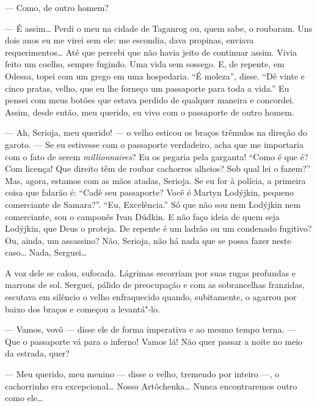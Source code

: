 --- Como, de outro homem?

--- É assim\ldots{} Perdi o meu na cidade de Taganrog ou, quem sabe, o
roubaram. Uns dois anos eu me virei sem ele: me escondia, dava propinas,
enviava requerimentos\ldots{} Até que percebi que não havia jeito de
continuar assim. Vivia feito um coelho, sempre fugindo. Uma vida sem
sossego. E, de repente, em Odessa, topei com um grego em uma hospedaria.
``É moleza'', disse. ``Dê vinte e cinco pratas, velho, que eu lhe forneço
um passaporte para toda a vida.'' Eu pensei com meus botões que estava
perdido de qualquer maneira e concordei. Assim, desde então, meu
querido, eu vivo com o passaporte de outro homem.


--- Ah, Serioja, meu querido! --- o velho esticou os braços trêmulos na
direção do garoto. --- Se eu estivesse com o passaporte verdadeiro, acha
que me importaria com o fato de serem \emph{millionnaires}? Eu os pegaria
pela garganta! ``Como é que é? Com licença! Que direito têm de roubar
cachorros alheios? Sob qual lei o fazem?'' Mas, agora, estamos com as
mãos atadas, Serioja. Se eu for à polícia, a primeira coisa que falarão
é: ``Cadê seu passaporte? Você é Martyn Lodýjkin, pequeno comerciante de
Samara?''. ``Eu, Excelência.'' Só que não sou nem Lodýjkin nem
comerciante, sou o camponês Ivan Dúdkin. E não faço ideia de quem seja
Lodýjkin, que Deus o proteja. De repente é um ladrão ou um condenado
fugitivo? Ou, ainda, um assassino? Não, Serioja, não há nada que se
possa fazer neste caso\ldots{} Nada, Serguei\ldots{}

A voz dele se calou, sufocada. Lágrimas escorriam por suas rugas
profundas e marrons de sol. Serguei, pálido de preocupação e com as
sobrancelhas franzidas, escutava em silêncio o velho enfraquecido
quando, subitamente, o agarrou por baixo dos braços e começou a
levantá"-lo.

--- Vamos, vovô --- disse ele de forma imperativa e ao mesmo tempo
terna. --- Que o passaporte vá para o inferno! Vamos lá! Não quer passar a
noite no meio da estrada, quer?

--- Meu querido, meu menino --- disse o velho, tremendo por inteiro ---,
o cachorrinho era excepcional\ldots{} Nosso Artôchenka\ldots{} Nunca encontraremos
outro como ele\ldots{}


